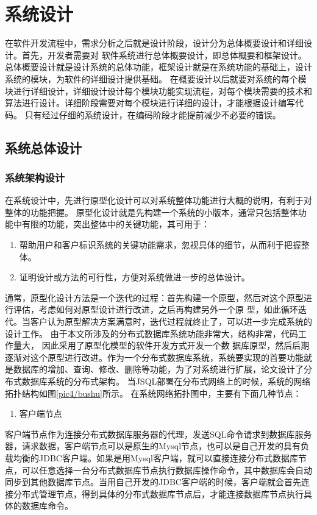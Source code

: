 
\chapter{系统设计}
在软件开发流程中，需求分析之后就是设计阶段，设计分为总体概要设计和详细设计。首先，开发者需要对
软件系统进行总体概要设计，即总体概要和框架设计。总体概要设计就是设计系统的总体功能，框架设计就是在系统功能的基础上，设计系统的模块，为软件的详细设计提供基础。
在概要设计以后就要对系统的每个模块进行详细设计，详细设计设计每个模块功能实现流程，对每个模块需要的技术和算法进行设计。详细阶段需要对每个模块进行详细的设计，才能根据设计编写代码。
只有经过仔细的系统设计，在编码阶段才能提前减少不必要的错误。
\section{系统总体设计}
\subsection{系统架构设计}
在系统设计中，先进行原型化设计可以对系统整体功能进行大概的说明，有利于对整体的功能把握。
原型化设计就是先构建一个系统的小版本，通常只包括整体功能中有限的功能，突出整体中的关键功能，其可用于：
\begin{enumerate}
	\item 帮助用户和客户标识系统的关键功能需求，忽视具体的细节，从而利于把握整体。
	\item 证明设计或方法的可行性，方便对系统做进一步的总体设计。
\end{enumerate}
通常，原型化设计方法是一个迭代的过程：首先构建一个原型，然后对这个原型进行评估，考虑如何对原型设计进行改进，之后再构建另外一个原
型，如此循环迭代。当客户认为原型解决方案满意时，迭代过程就终止了，可以进一步完成系统的设计工作。
由于本文所涉及的分布式数据库系统功能非常大，结构非常，代码工作量大，
因此采用了原型化模型的软件开发方式开发一个数
据库原型，然后后期逐渐对这个原型进行改进。作为一个分布式数据库系统，系统要实现的首要功能就是数据库的增加、查询、修改、删除等功能，为了对系统进行扩展，论文设计了分布式数据库系统的分布式架构。
当JSQL部署在分布式网络上的时候，系统的网络拓扑结构如图\ref{pic4/bushu}所示。
在系统网络拓扑图中，主要有下面几种节点：


	\begin{enumerate}
		\item 客户端节点
	\end{enumerate}

	客户端节点作为连接分布式数据库服务器的代理，发送SQL命令请求到数据库服务器，请求数据，客户端节点可以是原生的Mysql节点，也可以是自己开发的具有负载均衡的JDBC客户端。如果是用Mysql客户端，就可以直接连接分布式数据库节点，可以任意选择一台分布式数据库节点执行数据库操作命令，其中数据库会自动同步到其他数据库节点。当用自己开发的JDBC客户端的时候，客户端就会首先连接分布式管理节点，得到具体的分布式数据库节点后，才能连接数据库节点执行具体的数据库命令。


